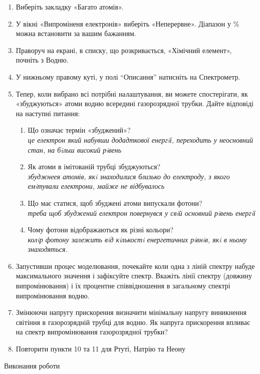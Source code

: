 \documentclass[a4paper,14pt]{extreport}
\begin{document}
\begin{enumerate}
\item Виберіть закладку «Багато атомів».
\item У вікні «Випроміненя електронів» виберіть «Неперервне». Діапазон у \% 
можна встановити за вашим бажанням.
\item Праворуч на екрані, в списку, що розкривається, «Хімічний елемент», почніть 
з Водню.
\item У нижньому правому куті, у полі “Описання” натисніть на Спектрометр.
\item Тепер, коли вибрано всі потрібні налаштування, ви можете спостерігати, як 
«збуджуються» атоми водню всередині газорозрядної трубки. Дайте відповіді 
на наступні питання:
	\begin{enumerate}
	\item Що означає термін «збуджений»?\\
	\emph{це електрон який набувши додадткової
		енергiї, переходить у неосновний стан, на бiльш високий рiвень}
	\item Як атоми в імітованій трубці збуджуються?\\
	\emph{збуджнеея атомів, якi знаходилися близько до електроду, з якого емiтували	електрони, майже не відбувалось}
	\item Що має статися, щоб збуджені атоми випускали фотони?\\
	\emph{треба щоб збуджений електрон повернувся у свiй основний рiвень енергiї}
	\item Чому фотони відображаються як різні кольори?\\
	\emph{колiр фотону залежить вiд кiлькостi енергетичних рiвнiв, якi в ньому знаходяться.}
	\end{enumerate}
\item Запустивши процес моделювання, почекайте коли одна з ліній спектру набуде 
максимального значення і зафіксуйте спектр. Вкажіть лінії спектру (довжину 
випромінювання) і їх процентне співвідношення в загальному спектрі 
випромінювання водню. 
\item Змінюючи напругу прискорення визначити мінімальну напругу виникнення 
світіння в газорозрядній трубці для водню. Як напруга прискорення впливає 
на спектр випромінювання газорозрядної трубки?
\item Повторити пункти 10 та 11 для Ртуті, Натрію та Неону
\end{enumerate}
\newpage
\begin{center}
Виконання роботи
\end{center}
\end{document}
